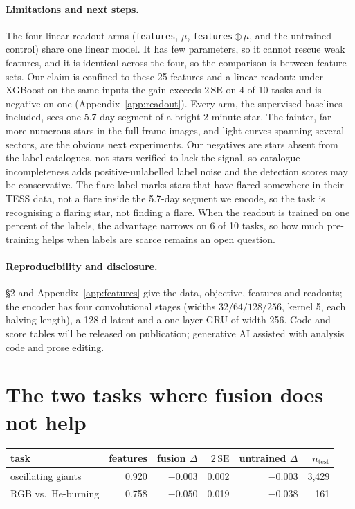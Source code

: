 \documentclass{article}
\begin{document}
\paragraph{\textbf{Limitations and next steps.}} The four linear-readout arms (\texttt{features},
$\mu$, \texttt{features}\,$\oplus\,\mu$, and the untrained control) share one linear model. It has few
parameters, so it cannot rescue weak features, and it is identical across the four, so the comparison
is between feature sets. Our claim is confined to these 25 features and a linear readout: under
XGBoost on the same inputs the gain exceeds $2\,\mathrm{SE}$ on 4 of 10 tasks and is negative on one
(Appendix~\ref{app:readout}). Every arm,
the supervised baselines included, sees one 5.7-day segment of a bright 2-minute star. The fainter,
far more numerous stars in the full-frame images, and light curves spanning several sectors, are the
obvious next experiments. Our
negatives are stars absent from the label catalogues, not stars verified to lack the signal, so
catalogue incompleteness adds positive-unlabelled label noise and the detection scores may be
conservative. The flare label marks stars that have flared somewhere in their TESS data, not a flare inside
the 5.7-day segment we encode, so the task is recognising a flaring star, not finding a flare. When
the readout is trained on one percent of the labels, the advantage narrows on 6 of 10 tasks, so how
much pre-training helps when labels are scarce remains an open question.

\paragraph{Reproducibility and disclosure.} \S2 and Appendix~\ref{app:features} give the data,
objective, features and readouts; the encoder has four convolutional stages (widths $32/64/128/256$,
kernel 5, each halving length), a 128-d latent and a one-layer GRU of width 256. Code and score
tables will be released on publication; generative AI assisted with analysis code and prose editing.

\raggedbottom



\appendix

\section{The two tasks where fusion does not help}
\label{app:negatives}

\begin{center}
\small
\begin{tabular}{lrrrrr}
\toprule
task & features & fusion $\Delta$ & $2\,\mathrm{SE}$ & untrained $\Delta$ & $n_{\mathrm{test}}$ \\
\midrule
oscillating giants & 0.920 & $-0.003$ & 0.002 & $-0.003$ & 3{,}429 \\
RGB vs.\ He-burning & 0.758 & $-0.050$ & 0.019 & $-0.038$ & 161 \\
\bottomrule
\end{tabular}
\end{center}
\end{document}

